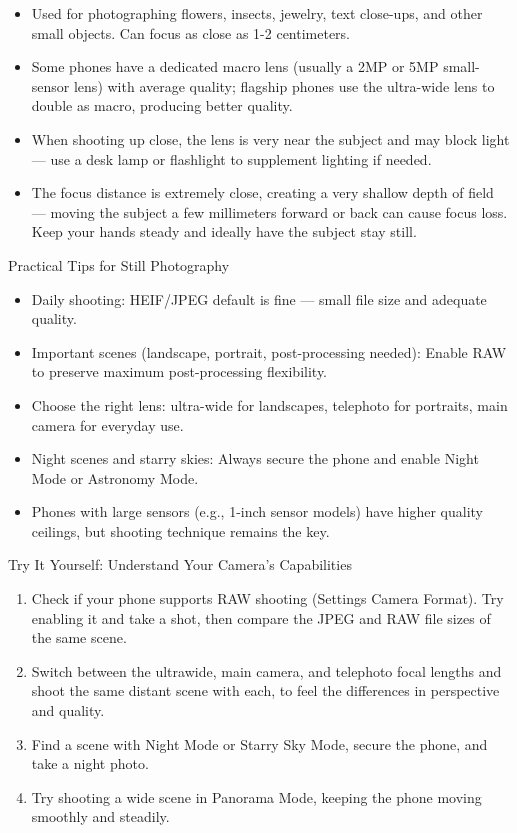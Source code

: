 \begin{itemize}
  \item Used for photographing flowers, insects, jewelry, text close-ups, and other small objects. Can focus as close as 1-2 centimeters.
  \item Some phones have a dedicated macro lens (usually a 2MP or 5MP small-sensor lens) with average quality; flagship phones use the ultra-wide lens to double as macro, producing better quality.
  \item When shooting up close, the lens is very near the subject and may block light — use a desk lamp or flashlight to supplement lighting if needed.
  \item The focus distance is extremely close, creating a very shallow depth of field — moving the subject a few millimeters forward or back can cause focus loss. Keep your hands steady and ideally have the subject stay still.
\end{itemize}

\begin{tcbinfo}{Practical Tips for Still Photography}
\begin{itemize}
  \item Daily shooting: HEIF/JPEG default is fine — small file size and adequate quality.
  \item Important scenes (landscape, portrait, post-processing needed): Enable RAW to preserve maximum post-processing flexibility.
  \item Choose the right lens: ultra-wide for landscapes, telephoto for portraits, main camera for everyday use.
  \item Night scenes and starry skies: Always secure the phone and enable Night Mode or Astronomy Mode.
  \item Phones with large sensors (e.g., 1-inch sensor models) have higher quality ceilings, but shooting technique remains the key.
\end{itemize}

\end{tcbinfo}

\begin{tcbpractice}{Try It Yourself: Understand Your Camera's Capabilities}
\begin{enumerate}
  \item Check if your phone supports RAW shooting (Settings Camera Format). Try enabling it and take a shot, then compare the JPEG and RAW file sizes of the same scene.
  \item Switch between the ultrawide, main camera, and telephoto focal lengths and shoot the same distant scene with each, to feel the differences in perspective and quality.
  \item Find a scene with Night Mode or Starry Sky Mode, secure the phone, and take a night photo.
  \item Try shooting a wide scene in Panorama Mode, keeping the phone moving smoothly and steadily.
\end{enumerate}

\end{tcbpractice}

